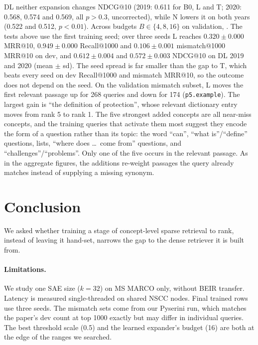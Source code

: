 DL neither expansion changes NDCG@10 (2019: 0.611 for B0, L and T; 2020: 0.568, 0.574 and 0.569, all
$p>0.3$, uncorrected), while N lowers it on both years (0.522 and 0.512, $p<0.01$).
Across budgets $B\in\{4,8,16\}$ on validation, . The tests above use the first training
seed; over three seeds L reaches $0.320\pm0.000$ MRR@10, $0.949\pm0.000$ Recall@1000 and $0.106\pm0.001$
mismatch@1000 MRR@10 on dev, and $0.612\pm0.004$ and $0.572\pm0.003$ NDCG@10 on DL 2019 and 2020 (mean
$\pm$ sd). The seed spread is far smaller than the gap to T, which beats every seed on dev Recall@1000 and
mismatch MRR@10, so the outcome does not depend on the seed.
On the validation mismatch subset, L moves the first relevant passage up for 268 queries and down for 174
(\texttt{p5.example}). The largest gain is ``the definition of protection'', whose relevant dictionary entry
moves from rank 5 to rank 1. The five strongest added concepts are all near-miss concepts, and the training
queries that activate them most suggest they encode the form of a question rather than its topic: the word
``can'', ``what is''/``define'' questions, lists, ``where does \ldots\ come from'' questions, and
``challenges''/``problems''. Only one of the five occurs in the relevant passage. As in the aggregate figures,
the additions re-weight passages the query already matches instead of supplying a missing synonym.

\section{Conclusion}
\label{sec:conclusion}

We asked whether training a stage of concept-level sparse retrieval to rank, instead of leaving it hand-set,
narrows the gap to the dense retriever it is built from. 

\paragraph{Limitations.}
We study one SAE size ($k=32$) on MS MARCO only, without BEIR transfer. Latency is measured single-threaded
on shared NSCC nodes. Final trained rows use three seeds. The mismatch sets come from our Pyserini run, which
matches the paper's dev count at top 1000 exactly but may differ in individual queries. The best threshold scale
(0.5) and the learned expander's budget (16) are both at the edge of the ranges we searched.

